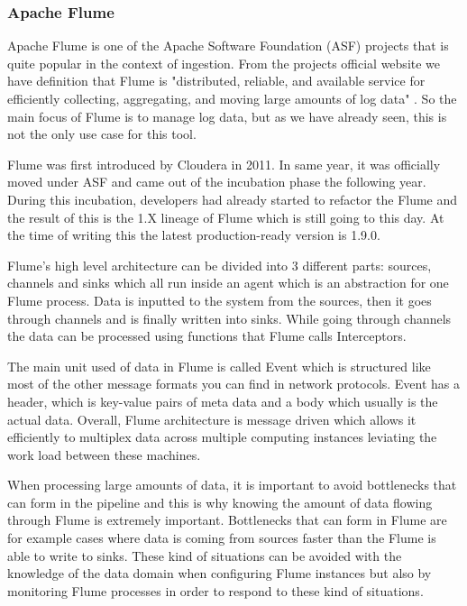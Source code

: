 \subsubsection{Apache Flume}

Apache Flume is one of the Apache Software Foundation (ASF) projects that is quite popular in the context of ingestion.
From the projects official website we have definition that Flume is "distributed, reliable, and available service for efficiently collecting, aggregating, and moving large amounts of log data" \cite{flume}.
So the main focus of Flume is to manage log data, but as we have already seen, this is not the only use case for this tool.

Flume was first introduced by Cloudera in 2011.
In same year, it was officially moved under ASF and came out of the incubation phase the following year.
During this incubation, developers had already started to refactor the Flume and the result of this is the 1.X lineage of Flume which is still going to this day. \cite{hoffman}
At the time of writing this the latest production-ready version is 1.9.0.

Flume's high level architecture can be divided into 3 different parts: sources, channels and sinks which all run inside an agent which is an abstraction for one Flume process.
Data is inputted to the system from the sources, then it goes through channels and is finally written into sinks. 
While going through channels the data can be processed using functions that Flume calls Interceptors. \cite{hoffman}

The main unit used of data in Flume is called Event which is structured like most of the other message formats you can find in network protocols.
Event has a header, which is key-value pairs of meta data and a body which usually is the actual data. 
Overall, Flume architecture is message driven which allows it efficiently to multiplex data across multiple computing instances leviating the work load between these machines. \cite{hoffman}

When processing large amounts of data, it is important to avoid bottlenecks that can form in the pipeline and this is why knowing the amount of data flowing through Flume is extremely important.
Bottlenecks that can form in Flume are for example cases where data is coming from sources faster than the Flume is able to write to sinks.
These kind of situations can be avoided with the knowledge of the data domain when configuring Flume instances but also by monitoring Flume processes in order to respond to these kind of situations. \cite{hoffman}

